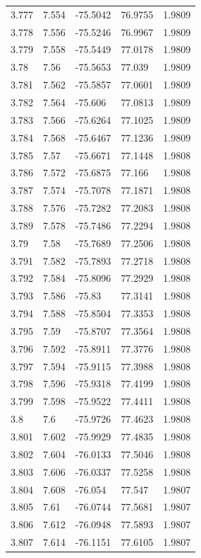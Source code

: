 \begin{tabular}{lllll}
3.777 & 7.554 & -75.5042 & 76.9755 & 1.9809 \\
3.778 & 7.556 & -75.5246 & 76.9967 & 1.9809 \\
3.779 & 7.558 & -75.5449 & 77.0178 & 1.9809 \\
3.78 & 7.56 & -75.5653 & 77.039 & 1.9809 \\
3.781 & 7.562 & -75.5857 & 77.0601 & 1.9809 \\
3.782 & 7.564 & -75.606 & 77.0813 & 1.9809 \\
3.783 & 7.566 & -75.6264 & 77.1025 & 1.9809 \\
3.784 & 7.568 & -75.6467 & 77.1236 & 1.9809 \\
3.785 & 7.57 & -75.6671 & 77.1448 & 1.9808 \\
3.786 & 7.572 & -75.6875 & 77.166 & 1.9808 \\
3.787 & 7.574 & -75.7078 & 77.1871 & 1.9808 \\
3.788 & 7.576 & -75.7282 & 77.2083 & 1.9808 \\
3.789 & 7.578 & -75.7486 & 77.2294 & 1.9808 \\
3.79 & 7.58 & -75.7689 & 77.2506 & 1.9808 \\
3.791 & 7.582 & -75.7893 & 77.2718 & 1.9808 \\
3.792 & 7.584 & -75.8096 & 77.2929 & 1.9808 \\
3.793 & 7.586 & -75.83 & 77.3141 & 1.9808 \\
3.794 & 7.588 & -75.8504 & 77.3353 & 1.9808 \\
3.795 & 7.59 & -75.8707 & 77.3564 & 1.9808 \\
3.796 & 7.592 & -75.8911 & 77.3776 & 1.9808 \\
3.797 & 7.594 & -75.9115 & 77.3988 & 1.9808 \\
3.798 & 7.596 & -75.9318 & 77.4199 & 1.9808 \\
3.799 & 7.598 & -75.9522 & 77.4411 & 1.9808 \\
3.8 & 7.6 & -75.9726 & 77.4623 & 1.9808 \\
3.801 & 7.602 & -75.9929 & 77.4835 & 1.9808 \\
3.802 & 7.604 & -76.0133 & 77.5046 & 1.9808 \\
3.803 & 7.606 & -76.0337 & 77.5258 & 1.9808 \\
3.804 & 7.608 & -76.054 & 77.547 & 1.9807 \\
3.805 & 7.61 & -76.0744 & 77.5681 & 1.9807 \\
3.806 & 7.612 & -76.0948 & 77.5893 & 1.9807 \\
3.807 & 7.614 & -76.1151 & 77.6105 & 1.9807 \\

\end{tabular}
